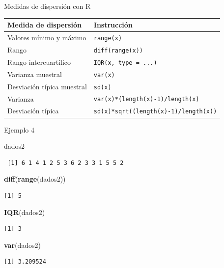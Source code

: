 \documentclass[
  ignorenonframetext,
]{beamer}
\newenvironment{Shaded}{\begin{snugshade}}{\end{snugshade}}
\newcommand{\KeywordTok}[1]{\textcolor[rgb]{0.13,0.29,0.53}{\textbf{#1}}}
\newcommand{\NormalTok}[1]{#1}
\begin{document}
\begin{frame}[fragile]{Medidas de dispersión con R}
\protect\hypertarget{medidas-de-dispersiuxf3n-con-r}{}

\begin{longtable}[]{@{}ll@{}}
\toprule
Medida de dispersión & Instrucción\tabularnewline
\midrule
\endhead
Valores mínimo y máximo & \texttt{range(x)}\tabularnewline
Rango & \texttt{diff(range(x))}\tabularnewline
Rango intercuartílico & \texttt{IQR(x,\ type\ =\ ...)}\tabularnewline
Varianza muestral & \texttt{var(x)}\tabularnewline
Desviación típica muestral & \texttt{sd(x)}\tabularnewline
Varianza & \texttt{var(x)*(length(x)-1)/length(x)}\tabularnewline
Desviación típica &
\texttt{sd(x)*sqrt((length(x)-1)/length(x))}\tabularnewline
\bottomrule
\end{longtable}

\end{frame}

\begin{frame}[fragile]{Ejemplo 4}
\protect\hypertarget{ejemplo-4-1}{}

\begin{Shaded}
\begin{Highlighting}[]
\NormalTok{dados2}
\end{Highlighting}
\end{Shaded}

\begin{verbatim}
 [1] 6 1 4 1 2 5 3 6 2 3 3 1 5 5 2
\end{verbatim}

\begin{Shaded}
\begin{Highlighting}[]
\KeywordTok{diff}\NormalTok{(}\KeywordTok{range}\NormalTok{(dados2))}
\end{Highlighting}
\end{Shaded}

\begin{verbatim}
[1] 5
\end{verbatim}

\begin{Shaded}
\begin{Highlighting}[]
\KeywordTok{IQR}\NormalTok{(dados2)}
\end{Highlighting}
\end{Shaded}

\begin{verbatim}
[1] 3
\end{verbatim}

\begin{Shaded}
\begin{Highlighting}[]
\KeywordTok{var}\NormalTok{(dados2)}
\end{Highlighting}
\end{Shaded}

\begin{verbatim}
[1] 3.209524
\end{verbatim}

\end{frame}
\end{document}
